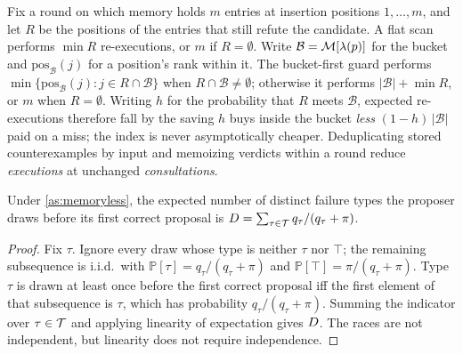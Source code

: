 \begin{proposition}
\label{prop:guardcost}
Fix a round on which memory holds $m$ entries at insertion positions
$1, \dots, m$, and let $R$ be the positions of the entries that still refute
the candidate. A flat scan performs $\min R$ re-executions, or $m$ if
$R = \emptyset$. Write $\mathcal{B} = \mathcal{M}[\lambda(p)]$ for the bucket and
$\mathrm{pos}_\mathcal{B}(j)$ for a position's rank within it. The
bucket-first guard performs $\min\{\mathrm{pos}_\mathcal{B}(j) : j \in R \cap
\mathcal{B}\}$ when $R \cap \mathcal{B} \neq \emptyset$; otherwise it performs
$\lvert\mathcal{B}\rvert + \min R$, or $m$ when $R = \emptyset$. Writing $h$
for the probability that $R$ meets $\mathcal{B}$, expected re-executions
therefore fall by the saving $h$ buys inside the bucket \emph{less}
$(1-h)\,\lvert\mathcal{B}\rvert$ paid on a miss; the index is never
asymptotically cheaper. Deduplicating stored
counterexamples by input and memoizing verdicts within a round reduce
\emph{executions} at unchanged \emph{consultations}.
\end{proposition}

\begin{lemma}
\label{lem:race}
Under \cref{as:memoryless}, the expected number of distinct failure types the
proposer draws before its first correct proposal is
$D = \sum_{\tau \in \mathcal{T}} q_\tau / (q_\tau + \pi)$.
\end{lemma}

\begin{proof}
Fix $\tau$. Ignore every draw whose type is neither $\tau$ nor $\top$; the
remaining subsequence is i.i.d.\ with $\mathbb{P}[\tau] = q_\tau/(q_\tau+\pi)$
and $\mathbb{P}[\top] = \pi/(q_\tau+\pi)$. Type $\tau$ is drawn at least once
before the first correct proposal iff the first element of that subsequence is
$\tau$, which has probability $q_\tau/(q_\tau+\pi)$. Summing the indicator over
$\tau \in \mathcal{T}$ and applying linearity of expectation gives $D$. The
races are not independent, but linearity does not require independence.
\end{proof}

